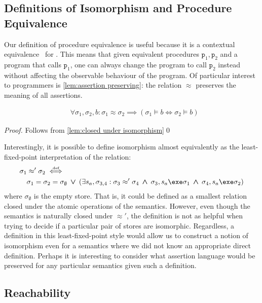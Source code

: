 \documentclass[runningheads,a4paper]{llncs}
\DeclareMathOperator{\band}{\bm{\;\land\;}}
\DeclareMathOperator{\bor}{\bm{\;\lor\;}}
\DeclareMathOperator{\suchthat}{:}
\newcommand*{\qvars}[2]{#1_{#2}}
\newcommand*{\defiff}{\stackrel{\text{\tiny def}}{\iff}}
\newcommand*\iso{\approx}
\newcommand*{\fun}{\texttt{p}}
\newcommand*{\store}{\sigma}
\newcommand*{\isoref}{\hyperref[def:global isomorphism]{\ensuremath{\iso}}}
\begin{document}
\subsection{Definitions of Isomorphism and Procedure Equivalence}

Our definition of procedure equivalence is useful because it is a contextual equivalence~\cite{Milner1977} for \lang{}. This means that given equivalent procedures $\fun_1,\fun_2$ and a program that calls $\fun_1$, one can always change the program to call $\fun_2$ instead without affecting the observable behaviour of the program.  Of particular interest to programmers is \cref{lem:assertion preserving}: the relation \isoref{} preserves the meaning of all assertions. 

\begin{corollary}\label{lem:assertion preserving}
	\[\begin{aligned}
		&\forall \store_1,\store_2,b \suchthat \store_1 \iso \store_2  \implies (\store_1\vDash{b} \iff \store_2\vDash{b})
	\end{aligned}\]
\end{corollary}
\begin{proof}Follows from \cref{lem:closed under isomorphism}\qed\end{proof}

Interestingly, it is possible to define isomorphism almost equivalently as the least-fixed-point interpretation of the relation: 
\[\begin{aligned} 
&	\store_1\iso'\store_2 \defiff \\
&\quad		\store_1=\store_2=\store_\emptyset \bor 
		\left(\exists s_a,\qvars{\store}{3,4} : \store_3\iso'\store_4 \band \store_3,s_a\exe\store_1 \band \store_4,s_a\exe\store_2\right)
\end{aligned}\]
where $\store_\emptyset$ is the empty store. That is, it could be defined as a smallest relation closed under the atomic operations of the semantics. However, even though the semantics is naturally closed under $\iso'$, the definition is not as helpful when trying to decide if a particular pair of stores are isomorphic. Regardless, a definition in this least-fixed-point style would allow us to construct a notion of isomorphism even for a semantics where we did not know an appropriate direct definition. Perhaps it is interesting to consider what assertion language would be preserved for any particular semantics given such a definition. 

\subsection{Reachability}\label{sec:reachability}
\end{document}
